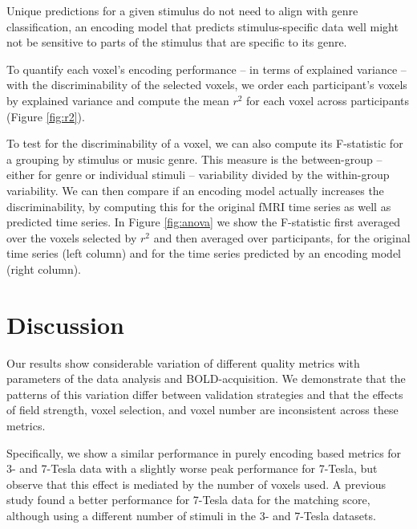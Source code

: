 Unique predictions for a given stimulus do not need to align with genre
classification, an encoding model that predicts stimulus-specific data well
might not be sensitive to parts of the stimulus that are specific to its genre. 

To quantify each voxel's encoding performance -- in terms of explained
variance -- with the discriminability of the selected voxels, we order each
participant's voxels by explained variance and compute the mean $r^2$ for each
voxel across participants (Figure \ref{fig:r2}). 

To test for the discriminability of a voxel, we can also compute its F-statistic
for a grouping by stimulus or music genre. This measure is the between-group --
either for genre or individual stimuli -- variability divided by the within-group
variability. We can then compare if an encoding model actually increases the
discriminability, by computing this for the original f{MRI} time series as well
as predicted time series. In Figure \ref{fig:anova} we show the F-statistic first averaged over the
voxels selected by $r^2$ and then averaged over participants, for the original
time series (left column) and for the time series predicted by an encoding model
(right column).


\section*{Discussion}


Our results show considerable variation of different quality metrics with
parameters of the data analysis and BOLD-acquisition. We demonstrate that the
patterns of this variation differ between validation strategies and that the
effects of field strength, voxel selection, and voxel number are inconsistent
across these metrics.

Specifically, we show a similar performance in purely encoding based metrics
for 3- and 7-Tesla data with a slightly worse peak performance for 7-Tesla, but
observe that this effect is mediated by the number of voxels used. A previous
study \citep{SF14} found a better performance for 7-Tesla data for the matching
score, although using a different number of stimuli in the 3- and 7-Tesla
datasets. %

